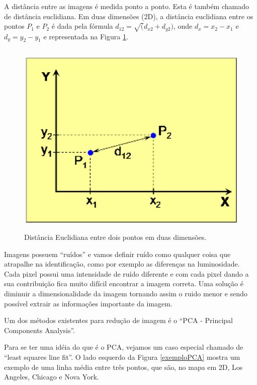 A distância entre as imagens é medida ponto a ponto. Esta é também chamado de distância euclidiana. Em duas dimensões (2D), a distância euclidiana entre os pontos $P_1$ e $P_2$ é dada pela fórmula $\displaystyle d_{12} = \sqrt(d_{x2} + d_{y2})$, onde $\displaystyle d_x = x_2 - x_1$ e $\displaystyle d_y = y_2-y_1$ e representada na Figura \ref{distanciaEntrePontos}.

    \begin{figure}[hbt]
		\begin{center}
			\includegraphics[height=9.5cm,width=12.5cm]{figuras/2.FundamentacaoTeorica/graficoDistanciaEntrePontos.png}
		\end{center}
		\caption{Distância Euclidiana entre dois pontos em duas dimensões.}
		\label{distanciaEntrePontos}
	\end{figure}


Imagens possuem ``ruídos'' e vamos definir ruído como qualquer coisa que atrapalhe na identificação, como por exemplo as diferenças na luminosidade. Cada pixel possui uma intensidade de ruído diferente e com cada pixel dando a sua contribuição fica muito difícil encontrar a imagem correta. Uma solução é diminuir a dimensionalidade da imagem tornando assim o ruido menor e sendo possível extrair as informações importante da imagem.

Um dos métodos existentes para redução de imagem é o ``PCA - Principal Components Analysis''.

Para se ter uma idéia do que é o PCA, vejamos um caso especial chamado de ``least squares line fit''. O lado esquerdo da Figura \ref{exemploPCA} mostra um exemplo de uma linha média entre três pontos, que são, no mapa em 2D, Los Angeles, Chicago e Nova York.


